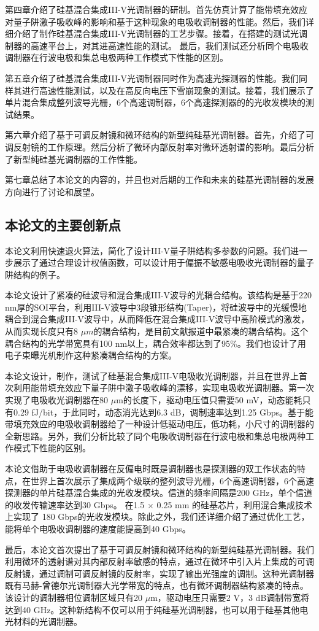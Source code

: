 第四章介绍了硅基混合集成III-V光调制器的研制。首先仿真计算了能带填充效应对量子阱激子吸收峰的影响和基于这种现象的电吸收调制器的性能。然后，我们详细介绍了制作硅基混合集成III-V光调制器的工艺步骤。接着，在搭建的测试光调制器的高速平台上，对其进高速性能的测试。 最后，我们测试还分析同个电吸收调制器在行波电极和集总电极两种工作模式下性能的区别。

第五章介绍了硅基混合集成III-V光调制器同时作为高速光探测器的性能。我们同样其进行高速性能测试，以及在高反向电压下雪崩现象的测试。接着，我们展示了单片混合集成整列波导光栅，6个高速调制器，6个高速探测器的的光收发模块的测试结果。

第六章介绍了基于可调反射镜和微环结构的新型纯硅基光调制器。首先，介绍了可调反射镜的工作原理。然后分析了微环内部反射率对微环透射谱的影响。最后分析了新型纯硅基光调制器的工作性能。

第七章总结了本论文的内容的，并且也对后期的工作和未来的硅基光调制器的发展方向进行了讨论和展望。

\subsection{本论文的主要创新点}
本论文利用快速退火算法，简化了设计III-V量子阱结构多参数的问题。我们进一步展示了通过合理设计权值函数，可以设计用于偏振不敏感电吸收光调制器的量子阱结构的例子。

本论文设计了紧凑的硅波导和混合集成III-V波导的光耦合结构。该结构是基于220 nm厚的SOI平台，利用III-V波导中3段锥形结构(Taper)，将硅波导中的光缓慢地耦合到混合集成III-V波导中，从而降低在混合集成III-V波导中高阶模式的激发，从而实现长度只有8 $\mu m$的耦合结构，是目前文献报道中最紧凑的耦合结构。这个耦合结构的光学带宽具有100 nm以上，耦合效率都达到了95\%。我们也设计了用电子束曝光机制作这种紧凑耦合结构的方案。

本论文设计，制作，测试了硅基混合集成III-V电吸收光调制器，并且在世界上首次利用能带填充效应下量子阱中激子吸收峰的漂移，实现电吸收光调制器。第一次实现了电吸收光调制器在80  $\mu$m的长度下，驱动电压值只需要50 mV，动态能耗只有0.29 fJ/bit，于此同时，动态消光达到6.3 dB，调制速率达到1.25 Gbps。基于能带填充效应的电吸收调制器给了一种设计低驱动电压，低功耗，小尺寸的调制器的全新思路。另外，我们分析比较了同个电吸收调制器在行波电极和集总电极两种工作模式下性能的区别。

本论文借助于电吸收调制器在反偏电时既是调制器也是探测器的双工作状态的特点，在世界上首次展示了集成两个级联的整列波导光栅，6个高速调制器，6个高速探测器的单片硅基混合集成的光收发模块。信道的频率间隔是200 GHz，单个信道的收发传输速率达到30 Gbps。 在1.5 $\times$ 0.25 mm 的硅基芯片，利用混合集成技术上实现了 180 Gbps的光收发模块。除此之外，我们还详细介绍了通过优化工艺，能将单个电吸收调制器的速度能提高到40 Gbps。

最后，本论文首次提出了基于可调反射镜和微环结构的新型纯硅基光调制器。我们利用微环的透射谱对其内部反射率敏感的特点，通过在微环中引入片上集成的可调反射镜，通过调制可调反射镜的反射率，实现了输出光强度的调制。这种光调制器既有马赫-曾德尔光调制器大光学带宽的特点，也有微环调制器结构紧凑的特点。该设计的调制器相位调制区域只有20 $\mu$m，驱动电压只需要2 V，3 dB调制带宽将达到40 GHz。这种新结构不仅可以用于纯硅基光调制器，也可以用于硅基其他电光材料的光调制器。




